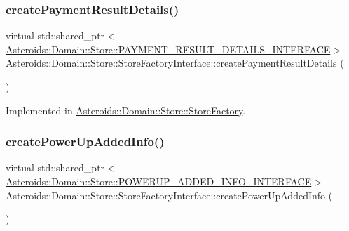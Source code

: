 \subsubsection{\texorpdfstring{create\+Payment\+Result\+Details()}{createPaymentResultDetails()}}
{\footnotesize\ttfamily virtual std\+::shared\+\_\+ptr$<$\hyperlink{classAsteroids_1_1Domain_1_1Store_1_1PAYMENT__RESULT__DETAILS__INTERFACE}{Asteroids\+::\+Domain\+::\+Store\+::\+P\+A\+Y\+M\+E\+N\+T\+\_\+\+R\+E\+S\+U\+L\+T\+\_\+\+D\+E\+T\+A\+I\+L\+S\+\_\+\+I\+N\+T\+E\+R\+F\+A\+CE}$>$ Asteroids\+::\+Domain\+::\+Store\+::\+Store\+Factory\+Interface\+::create\+Payment\+Result\+Details (\begin{DoxyParamCaption}{ }\end{DoxyParamCaption})\hspace{0.3cm}{\ttfamily [pure virtual]}}



Implemented in \hyperlink{classAsteroids_1_1Domain_1_1Store_1_1StoreFactory_a5489405a1a23048570d89de58a456982}{Asteroids\+::\+Domain\+::\+Store\+::\+Store\+Factory}.

\mbox{\label{classAsteroids_1_1Domain_1_1Store_1_1StoreFactoryInterface_a6cac2d91c8da57941879b15c624b2215}} 
\subsubsection{\texorpdfstring{create\+Power\+Up\+Added\+Info()}{createPowerUpAddedInfo()}}
{\footnotesize\ttfamily virtual std\+::shared\+\_\+ptr$<$\hyperlink{classAsteroids_1_1Domain_1_1Store_1_1POWERUP__ADDED__INFO__INTERFACE}{Asteroids\+::\+Domain\+::\+Store\+::\+P\+O\+W\+E\+R\+U\+P\+\_\+\+A\+D\+D\+E\+D\+\_\+\+I\+N\+F\+O\+\_\+\+I\+N\+T\+E\+R\+F\+A\+CE}$>$ Asteroids\+::\+Domain\+::\+Store\+::\+Store\+Factory\+Interface\+::create\+Power\+Up\+Added\+Info (\begin{DoxyParamCaption}{ }\end{DoxyParamCaption})\hspace{0.3cm}{\ttfamily [pure virtual]}}



